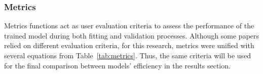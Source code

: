 \subsubsection{Metrics}
Metrics functions act as user evaluation criteria to assess the performance of the trained model during both fitting and validation processes.
Although some papers relied on different evaluation criteria, for this research, metrics were unified with several equations from \mbox{Table~\ref{tab:metrics}}.
Thus, the same criteria will be used for the final comparison between models' efficiency in the results section.
\begin{table}[htbp]
    \renewcommand{\arraystretch}{1.3}
    \caption{Model's metrics functions}
    \centering
    \label{tab:metrics}
\end{table}
